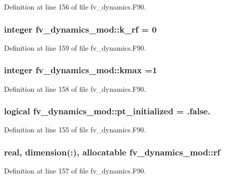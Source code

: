 Definition at line 156 of file fv\-\_\-dynamics.\-F90.

\subsubsection[{k\-\_\-rf}]{\setlength{\rightskip}{0pt plus 5cm}integer fv\-\_\-dynamics\-\_\-mod\-::k\-\_\-rf = 0}\label{classfv__dynamics__mod_ac064d1ed1892a3588eb7c6f430954753}


Definition at line 159 of file fv\-\_\-dynamics.\-F90.

\subsubsection[{kmax}]{\setlength{\rightskip}{0pt plus 5cm}integer fv\-\_\-dynamics\-\_\-mod\-::kmax =1}\label{classfv__dynamics__mod_a223d12ae03cc1c109ba5999ef065bb4a}


Definition at line 158 of file fv\-\_\-dynamics.\-F90.

\subsubsection[{pt\-\_\-initialized}]{\setlength{\rightskip}{0pt plus 5cm}logical fv\-\_\-dynamics\-\_\-mod\-::pt\-\_\-initialized = .false.}\label{classfv__dynamics__mod_a1c473782ffaa6249be5ba2c3d35a59dc}


Definition at line 155 of file fv\-\_\-dynamics.\-F90.

\subsubsection[{rf}]{\setlength{\rightskip}{0pt plus 5cm}real, dimension(\-:), allocatable fv\-\_\-dynamics\-\_\-mod\-::rf}\label{classfv__dynamics__mod_a9e9aac45b5404781dcafeff189daf4de}


Definition at line 157 of file fv\-\_\-dynamics.\-F90.

